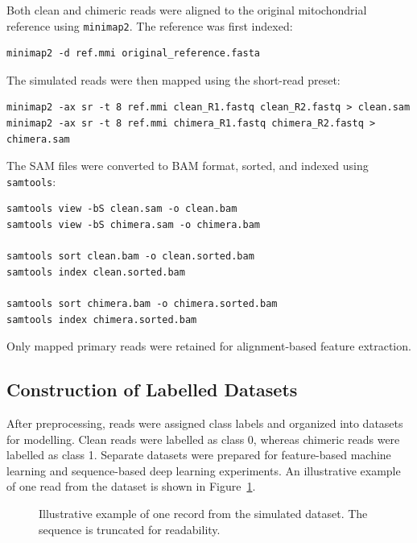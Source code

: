 Both clean and chimeric reads were aligned to the original mitochondrial reference using \texttt{minimap2}. The reference was first indexed:

\begin{verbatim}
minimap2 -d ref.mmi original_reference.fasta
\end{verbatim}

The simulated reads were then mapped using the short-read preset:

\begin{verbatim}
minimap2 -ax sr -t 8 ref.mmi clean_R1.fastq clean_R2.fastq > clean.sam
minimap2 -ax sr -t 8 ref.mmi chimera_R1.fastq chimera_R2.fastq > chimera.sam
\end{verbatim}

The SAM files were converted to BAM format, sorted, and indexed using \texttt{samtools}:

\begin{verbatim}
samtools view -bS clean.sam -o clean.bam
samtools view -bS chimera.sam -o chimera.bam

samtools sort clean.bam -o clean.sorted.bam
samtools index clean.sorted.bam

samtools sort chimera.bam -o chimera.sorted.bam
samtools index chimera.sorted.bam
\end{verbatim}

Only mapped primary reads were retained for alignment-based feature extraction.

\subsection{Construction of Labelled Datasets}

After preprocessing, reads were assigned class labels and organized into datasets for modelling. Clean reads were labelled as class 0, whereas chimeric reads were labelled as class 1. Separate datasets were prepared for feature-based machine learning and sequence-based deep learning experiments. An illustrative example of one read from the dataset is shown in Figure~\ref{fig:dataset_example}.

\begin{figure}[H]
\centering
{}
\caption{Illustrative example of one record from the simulated dataset. The sequence is truncated for readability.}
\label{fig:dataset_example}
\end{figure}


